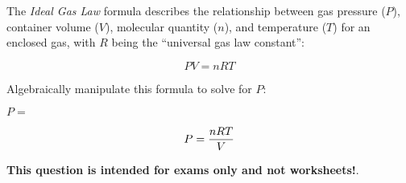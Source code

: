 

The {\it Ideal Gas Law} formula describes the relationship between gas pressure ($P$), container volume ($V$), molecular quantity ($n$), and temperature ($T$) for an enclosed gas, with $R$ being the ``universal gas law constant'':

$$PV = nRT$$

Algebraically manipulate this formula to solve for $P$:

\vskip 20pt

$P = $







$$P = {nRT \over V}$$







{\bf This question is intended for exams only and not worksheets!}.



